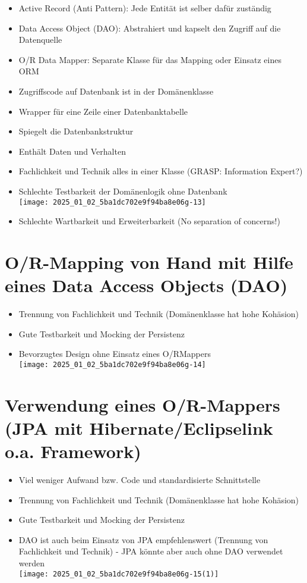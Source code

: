 \begin{itemize}
  \item Active Record (Anti Pattern): Jede Entität ist selber dafür zuständig
  \item Data Access Object (DAO): Abstrahiert und kapselt den Zugriff auf die Datenquelle
  \item O/R Data Mapper: Separate Klasse für das Mapping oder Einsatz eines ORM
  \item Zugriffscode auf Datenbank ist in der Domänenklasse
  \item Wrapper für eine Zeile einer Datenbanktabelle
  \item Spiegelt die Datenbankstruktur
  \item Enthält Daten und Verhalten
  \item Fachlichkeit und Technik alles in einer Klasse (GRASP: Information Expert?)
  \item Schlechte Testbarkeit der Domänenlogik ohne Datenbank\\
\texttt{[image: 2025\_01\_02\_5ba1dc702e9f94ba8e06g-13]}
  \item Schlechte Wartbarkeit und Erweiterbarkeit (No separation of concerns!)
\end{itemize}

\section*{O/R-Mapping von Hand mit Hilfe eines Data Access Objects (DAO)}
\begin{itemize}
  \item Trennung von Fachlichkeit und Technik (Domänenklasse hat hohe Kohäsion)
  \item Gute Testbarkeit und Mocking der Persistenz
  \item Bevorzugtes Design ohne Einsatz eines O/RMappers\\
\texttt{[image: 2025\_01\_02\_5ba1dc702e9f94ba8e06g-14]}
\end{itemize}

\section*{Verwendung eines O/R-Mappers (JPA mit Hibernate/Eclipselink o.a. Framework)}
\begin{itemize}
  \item Viel weniger Aufwand bzw. Code und standardisierte Schnittstelle
  \item Trennung von Fachlichkeit und Technik (Domänenklasse hat hohe Kohäsion)
  \item Gute Testbarkeit und Mocking der Persistenz
  \item DAO ist auch beim Einsatz von JPA empfehlenswert (Trennung von Fachlichkeit und Technik) - JPA könnte aber auch ohne DAO verwendet werden\\
\texttt{[image: 2025\_01\_02\_5ba1dc702e9f94ba8e06g-15(1)]}
\end{itemize}

